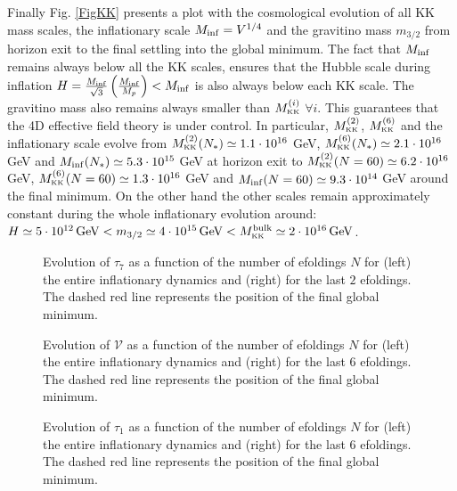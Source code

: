 \documentclass[11pt,a4paper]{article}
\def\KK{{\scriptscriptstyle \rm KK}}
\newcommand\vo{{\mathcal{V}}}
\begin{document}
Finally Fig. \ref{FigKK} presents a plot with the cosmological evolution of all KK mass scales, the inflationary scale $M_{\rm inf} = V^{1/4}$ and the gravitino mass $m_{3/2}$ from horizon exit to the final settling into the global minimum. The fact that $M_{\rm inf}$ remains always below all the KK scales, ensures that the Hubble scale during inflation $H = \frac{M_{\rm inf}}{\sqrt{3}}\left(\frac{M_{\rm inf}}{M_p}\right) < M_{\rm inf}$ is also always below each KK scale. The gravitino mass also remains always smaller than $M_\KK^{(i)}$ $\forall i$. This guarantees that the 4D effective field theory is under control. In particular, $M_\KK^{(2)}$, $M_\KK^{(6)}$ and the inflationary scale evolve from $M_\KK^{(2)}(N_*)\simeq 1.1\cdot 10^{16}$ GeV, $M_\KK^{(6)}(N_*)\simeq 2.1\cdot 10^{16}$ GeV and $M_{\rm inf}(N_*)\simeq 5.3\cdot 10^{15}$ GeV at horizon exit to $M_\KK^{(2)}(N=60)\simeq 6.2\cdot 10^{16}$ GeV, $M_\KK^{(6)}(N=60)\simeq 1.3\cdot 10^{16}$ GeV and $M_{\rm inf}(N=60)\simeq 9.3\cdot 10^{14}$ GeV around the final minimum. On the other hand the other scales remain approximately constant during the whole inflationary evolution around: $H\simeq 5\cdot 10^{12}\,{\rm GeV} < m_{3/2}\simeq 4\cdot 10^{15}\,{\rm GeV} < M_\KK^{\rm bulk}\simeq 2\cdot 10^{16}\,{\rm GeV}$.

\begin{figure}[ht]
\begin{center}
\caption{Evolution of $\tau_7$ as a function of the number of efoldings $N$ for (left) the entire inflationary dynamics and (right) for the last $2$ efoldings. The dashed red line represents the position of the final global minimum.}
\label{Figtau7}
\end{center}
\end{figure}

\begin{figure}[ht]
\begin{center}
\caption{Evolution of $\vo$ as a function of the number of efoldings $N$ for (left) the entire inflationary dynamics and (right) for the last $6$ efoldings. The dashed red line represents the position of the final global minimum.}
\label{FigVol}
\end{center}
\end{figure}

\begin{figure}[ht]
\begin{center}
\caption{Evolution of $\tau_1$ as a function of the number of efoldings $N$ for (left) the entire inflationary dynamics and (right) for the last $6$ efoldings. The dashed red line represents the position of the final global minimum.}
\label{Figtau1}
\end{center}
\end{figure}
\end{document}
